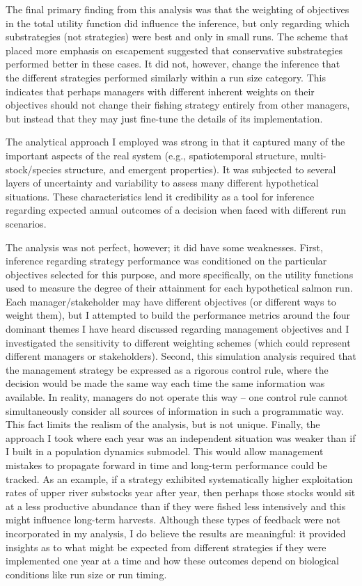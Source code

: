 \documentclass[12pt,]{book}
\theoremstyle{definition}
\theoremstyle{definition}
\theoremstyle{definition}
\theoremstyle{remark}
\begin{document}
The final primary finding from this analysis was that the weighting of
objectives in the total utility function did influence the inference,
but only regarding which substrategies (not strategies) were best and
only in small runs. The scheme that placed more emphasis on escapement
suggested that conservative substrategies performed better in these
cases. It did not, however, change the inference that the different
strategies performed similarly within a run size category. This
indicates that perhaps managers with different inherent weights on their
objectives should not change their fishing strategy entirely from other
managers, but instead that they may just fine-tune the details of its
implementation.

The analytical approach I employed was strong in that it captured many
of the important aspects of the real system (e.g., spatiotemporal
structure, multi-stock/species structure, and emergent properties). It
was subjected to several layers of uncertainty and variability to assess
many different hypothetical situations. These characteristics lend it
credibility as a tool for inference regarding expected annual outcomes
of a decision when faced with different run scenarios.

The analysis was not perfect, however; it did have some weaknesses.
First, inference regarding strategy performance was conditioned on the
particular objectives selected for this purpose, and more specifically,
on the utility functions used to measure the degree of their attainment
for each hypothetical salmon run. Each manager/stakeholder may have
different objectives (or different ways to weight them), but I attempted
to build the performance metrics around the four dominant themes I have
heard discussed regarding management objectives and I investigated the
sensitivity to different weighting schemes (which could represent
different managers or stakeholders). Second, this simulation analysis
required that the management strategy be expressed as a rigorous control
rule, where the decision would be made the same way each time the same
information was available. In reality, managers do not operate this way
-- one control rule cannot simultaneously consider all sources of
information in such a programmatic way. This fact limits the realism of
the analysis, but is not unique. Finally, the approach I took where each
year was an independent situation was weaker than if I built in a
population dynamics submodel. This would allow management mistakes to
propagate forward in time and long-term performance could be tracked. As
an example, if a strategy exhibited systematically higher exploitation
rates of upper river substocks year after year, then perhaps those
stocks would sit at a less productive abundance than if they were fished
less intensively and this might influence long-term harvests. Although
these types of feedback were not incorporated in my analysis, I do
believe the results are meaningful: it provided insights as to what
might be expected from different strategies if they were implemented one
year at a time and how these outcomes depend on biological conditions
like run size or run timing.
\end{document}
